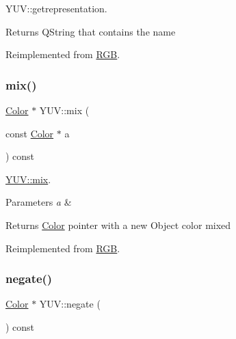 Y\+U\+V\+::getrepresentation. 

\begin{DoxyReturn}{Returns}
Q\+String that contains the name 
\end{DoxyReturn}


Reimplemented from \hyperlink{class_r_g_b_a5f7a68904e1e4f18c22c1066170fb2bf}{R\+GB}.

\mbox{\label{class_y_u_v_ab152a4ea37eaa67df0b38882c2099da3}} 
\subsubsection{\texorpdfstring{mix()}{mix()}}
{\footnotesize\ttfamily \hyperlink{class_color}{Color} $\ast$ Y\+U\+V\+::mix (\begin{DoxyParamCaption}\item[{const \hyperlink{class_color}{Color} $\ast$}]{a }\end{DoxyParamCaption}) const\hspace{0.3cm}{\ttfamily [virtual]}}



\hyperlink{class_y_u_v_ab152a4ea37eaa67df0b38882c2099da3}{Y\+U\+V\+::mix}. 


\begin{DoxyParams}{Parameters}
{\em a} & \\
\hline
\end{DoxyParams}
\begin{DoxyReturn}{Returns}
\hyperlink{class_color}{Color} pointer with a new Object color mixed 
\end{DoxyReturn}


Reimplemented from \hyperlink{class_r_g_b_aa022866e33474ab64f81d367c6b030b9}{R\+GB}.

\mbox{\label{class_y_u_v_a079872ae88552066ce1abb39cc0a40de}} 
\subsubsection{\texorpdfstring{negate()}{negate()}}
{\footnotesize\ttfamily \hyperlink{class_color}{Color} $\ast$ Y\+U\+V\+::negate (\begin{DoxyParamCaption}{ }\end{DoxyParamCaption}) const\hspace{0.3cm}{\ttfamily [virtual]}}



